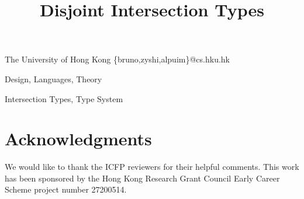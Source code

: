\documentclass[numbers]{sigplanconf}
\begin{document}
\toappear{}


\preprintfooter{\name}                        %

\title{Disjoint Intersection Types} 

           {The University of Hong Kong}
           {\{bruno,zyshi,alpuim\}@cs.hku.hk}

\maketitle

\begin{abstract}
  
\end{abstract}


\terms Design, Languages, Theory

\keywords Intersection Types, Type System



%




%



\section*{Acknowledgments}
We would like to thank the ICFP reviewers for their helpful comments.
This work has been sponsored by the Hong Kong Research Grant Council Early Career Scheme project number 27200514.




%
%
%
\end{document}
